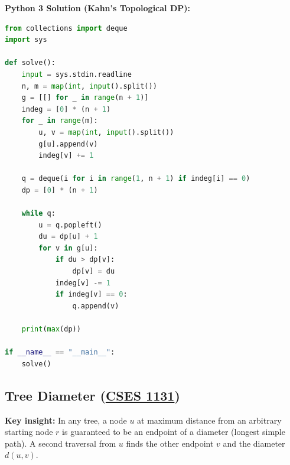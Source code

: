 \documentclass[11pt]{article}
\newcommand{\insight}[1]{\par\medskip\noindent\textbf{Key insight:} #1\par\smallskip}
\begin{document}
\textbf{Python 3 Solution (Kahn's Topological DP):}
\begin{lstlisting}[language=Python]
from collections import deque
import sys

def solve():
    input = sys.stdin.readline
    n, m = map(int, input().split())
    g = [[] for _ in range(n + 1)]
    indeg = [0] * (n + 1)
    for _ in range(m):
        u, v = map(int, input().split())
        g[u].append(v)
        indeg[v] += 1

    q = deque(i for i in range(1, n + 1) if indeg[i] == 0)
    dp = [0] * (n + 1)

    while q:
        u = q.popleft()
        du = dp[u] + 1
        for v in g[u]:
            if du > dp[v]:
                dp[v] = du
            indeg[v] -= 1
            if indeg[v] == 0:
                q.append(v)

    print(max(dp))

if __name__ == "__main__":
    solve()
\end{lstlisting}

\subsection{Tree Diameter (\href{https://cses.fi/problemset/task/1131}{CSES 1131})}

\insight{In any tree, a node $u$ at maximum distance from an arbitrary starting node $r$ is guaranteed to be an endpoint of a diameter (longest simple path). A second traversal from $u$ finds the other endpoint $v$ and the diameter $d(u, v)$.}
\end{document}
